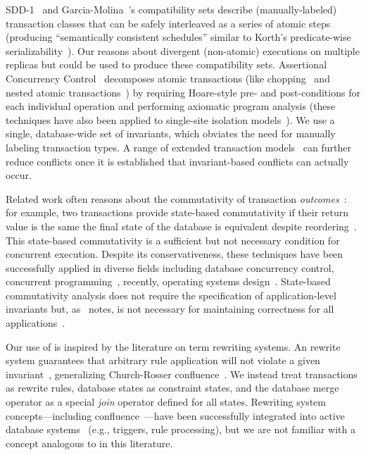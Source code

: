 SDD-1~\cite{sdd1} and Garcia-Molina~\cite{garciamolina-semantics}'s
compatibility sets describe (manually-labeled) transaction classes
that can be safely interleaved as a series of atomic steps (producing
``semantically consistent schedules'' similar to Korth's
predicate-wise serializability~\cite{korth-serializability}). Our
\iconfluence reasons about divergent (non-atomic) executions on
multiple replicas but could be used to produce these compatibility
sets. Assertional Concurrency Control~\cite{decomp-semantics}
decomposes atomic transactions (like chopping~\cite{chopping} and
nested atomic transactions~\cite{atomictransactions}) by requiring
Hoare-style pre- and post-conditions for each individual operation and
performing axiomatic program analysis (these techniques have also been
applied to single-site isolation
models~\cite{isolation-semantics}). We use a single, database-wide set
of invariants, which obviates the need for manually labeling
transaction types. A range of extended transaction models~\cite{acta}
can further reduce conflicts once it is established that
invariant-based conflicts can actually occur.

 Related work often reasons about
the commutativity of transaction \textit{outcomes}~\cite{boosting}:
for example, two transactions provide state-based commutativity if
their return value is the same the final state of the database is
equivalent despite reordering~\cite{weihl-thesis}. This state-based
commutativity is a sufficient but not necessary condition for
concurrent execution. Despite its conservativeness, these techniques
have been successfully applied in diverse fields including database
concurrency control, concurrent programming~\cite{boosting}, recently,
operating systems design~\cite{kohler-commutativity}. State-based
commutativity analysis does not require the specification of
application-level invariants but, as~\cite{kohler-commutativity}
notes, is not necessary for maintaining correctness for all
applications~\cite{lamport-audit}.

 Our use of \iconfluence is inspired by the
literature on term rewriting systems. An \iconfluent rewrite system
guarantees that arbitrary rule application will not violate a given
invariant~\cite{obs-confluence}, generalizing Church-Rosser
confluence~\cite{termrewriting}. We instead treat transactions as
rewrite rules, database states as constraint states, and the database
merge operator as a special \textit{join} operator defined for all
states.  Rewriting system concepts---including
confluence~\cite{aiken-confluence}---have been successfully integrated
into active database systems~\cite{activedb-book} (e.g., triggers,
rule processing), but we are not familiar with a concept analogous to
\iconfluence in this literature.

